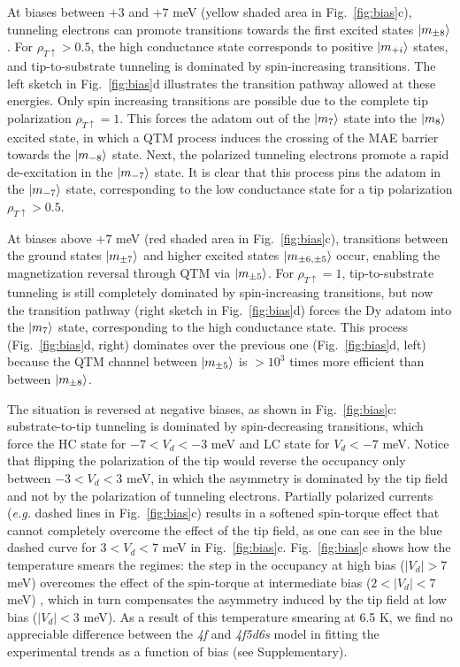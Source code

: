 \documentclass[
reprint,amsmath,amssymb,aps]{revtex4-2}
\begin{document}
At biases between $+3$ and $+7$ meV (yellow shaded area in Fig.~\ref{fig:bias}c), tunneling electrons can promote transitions towards the first excited states $\ket{m_{\pm 8}}$. For $\rho_{T \uparrow} > 0.5 $, the high conductance state corresponds to positive $\ket{m_{+i}}$ states, and tip-to-substrate tunneling is dominated by spin-increasing transitions. The left sketch in Fig.~\ref{fig:bias}d illustrates the transition pathway allowed at these energies. Only spin increasing transitions are possible due to the complete tip polarization $\rho_{T \uparrow} = 1$. This forces the adatom out of the $\ket{m_{7}}$ state into the $\ket{m_{8}}$ excited state, in which a QTM process induces the crossing of the MAE barrier towards the $\ket{m_{-8}}$ state. Next, the polarized tunneling electrons promote a rapid de-excitation in the $\ket{m_{-7}}$ state. It is clear that this process pins the adatom in the $\ket{m_{-7}}$ state, corresponding to the low conductance state for a tip polarization $\rho_{T \uparrow} > 0.5 $. 

At biases above $+7$ meV (red shaded area in Fig.~\ref{fig:bias}c), transitions between the ground states $\ket{m_{\pm7}}$ and higher excited states $\ket{m_{\pm 6, \pm 5}}$ occur, enabling the magnetization reversal through QTM via $\ket{m_{\pm 5}}$. For $\rho_{T \uparrow} = 1 $, tip-to-substrate tunneling is still completely dominated by spin-increasing transitions, but now the transition pathway (right sketch in Fig.~\ref{fig:bias}d) forces the Dy adatom into the $\ket{m_{7}}$ state, corresponding to the high conductance state. This process (Fig.~\ref{fig:bias}d, right) dominates over the previous one (Fig.~\ref{fig:bias}d, left) because the QTM channel between $\ket{m_{\pm 5}}$ is $>10^3$ times more efficient than between $\ket{m_{\pm 8}}$. 

The situation is reversed at negative biases, as shown in Fig.~\ref{fig:bias}c: substrate-to-tip tunneling is dominated by spin-decreasing transitions, which force the HC state for $-7<V_d<-3$ meV and LC state for $V_d<-7$ meV. Notice that flipping the polarization of the tip would reverse the occupancy only between $-3<V_d<3$ meV, in which the asymmetry is dominated by the tip field and not by the polarization of tunneling electrons. Partially polarized currents (\textit{e.g.} dashed lines in Fig.~\ref{fig:bias}c) results in a softened spin-torque effect that cannot completely overcome the effect of the tip field, as one can see in the blue dashed curve for $3<V_d<7$ meV in Fig.~\ref{fig:bias}c.  Fig.~\ref{fig:bias}c shows how the temperature smears the regimes: the step in the occupancy at high bias ($|V_d|>7$ meV) overcomes the effect of the spin-torque at intermediate bias ($2<|V_d|<7$ meV) , which in turn compensates the asymmetry induced by the tip field at low bias ($|V_d|<3$ meV). As a result of this temperature smearing at 6.5 K, we find no appreciable difference between the \textit{4f} and \textit{4f5d6s} model in fitting the experimental trends as a function of bias (see Supplementary).  
\end{document}
